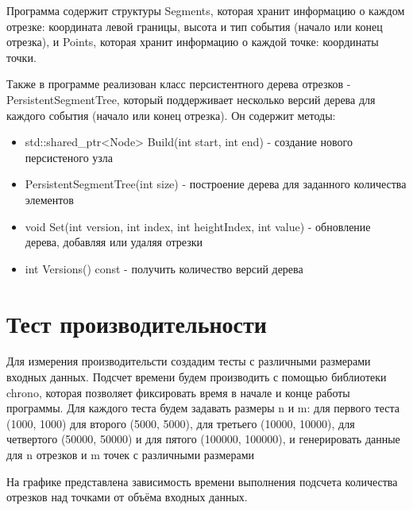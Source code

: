 \documentclass[12pt]{article}
\begin{document}
Программа содержит структуры Segments, которая хранит информацию о каждом отрезке: координата левой границы, высота и тип события (начало или конец отрезка), и Points, которая хранит информацию о каждой точке: координаты точки.

Также в программе реализован класс персистентного дерева отрезков - PersistentSegmentTree, который поддерживает несколько версий дерева  для каждого события (начало или конец отрезка). Он содержит методы:
\begin{itemize}
    \item std::shared\_ptr<Node> Build(int start, int end) - создание нового персистеного узла
    \item PersistentSegmentTree(int size) - построение дерева для заданного количества элементов
    \item void Set(int version, int index, int heightIndex, int value) - обновление дерева, добавляя или удаляя отрезки
    \item int Versions() const - получить количество версий дерева
\end{itemize}

\newpage
\section*{Тест производительности}

Для измерения производительсти создадим тесты с различными размерами входных данных. Подсчет времени будем производить с помощью библиотеки chrono, которая позволяет фиксировать время в начале и конце работы программы. Для каждого теста будем задавать размеры n и m: для первого теста (1000, 1000) для второго (5000, 5000), для третьего (10000, 10000), для четвертого (50000, 50000) и для пятого (100000, 100000), и генерировать данные для n отрезков и m точек с различными размерами

На графике представлена зависимость времени выполнения подсчета количества отрезков над точками от объёма входных данных.

\begin{figure}[htbp]
    \centering
    \label{fig:graph}
\end{figure}
\end{document}
